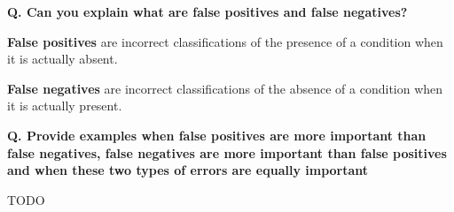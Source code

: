 

\begin{frame}[fragile]{\textbf{Q. Can you explain what are false positives and
false negatives?}}
\begin{wideitemize}
  \item \textbf{False positives} are incorrect classifications of the presence
  of a condition when it is actually absent.
  \item \textbf{False negatives} are incorrect classifications of the absence
  of a condition when it is actually present.
\end{wideitemize}
\end{frame}

\begin{frame}[fragile]{\textbf{Q. Provide examples when false positives are more
important than false negatives, false negatives are more important than false
positives and when these two types of errors are equally important}}
\begin{wideitemize}
  \item TODO
\end{wideitemize}
\end{frame}


